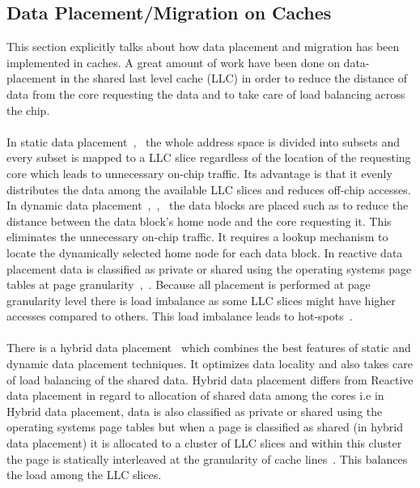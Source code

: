\documentclass{listhesis}
\begin{document}
\subsection{Data Placement/Migration on Caches}
This section explicitly talks about how data placement and migration has been implemented in caches. 
A great amount of work have been done on data-placement in the shared last level cache (LLC) in order to reduce the distance of data from the core requesting the data and to take care of load balancing across the chip.\\
\\
In static data placement~\cite{cacheDataPlacement1},~\cite{cacheDataPlacement2} the whole address space is divided into subsets and every subset is mapped to a LLC slice regardless of the location of the requesting core which leads to unnecessary on-chip traffic. Its advantage is that it evenly distributes the data among the available LLC slices and reduces off-chip accesses. In dynamic data placement~\cite{cacheDataPlacement1},~\cite{cacheDataPlacement3},~\cite{cacheDataPlacement4} the data blocks are placed such as to reduce the distance between the data block's home node and the core requesting it. This eliminates the unnecessary on-chip traffic. It requires a lookup mechanism to locate the dynamically selected home node for each data block. In reactive data placement data is classified as private or shared using the operating systems page tables at page granularity~\cite{cacheDataPlacement4},~\cite{cacheDataPlacement6}. Because all placement is performed at page granularity level there is load imbalance as some LLC slices might have higher accesses compared to others. This load imbalance leads to hot-spots~\cite{cacheDataPlacement6}.\\
\\
There is a hybrid data placement~\cite{cacheDataPlacement6} which combines the best features of static and dynamic data placement techniques. It optimizes data locality and also takes care of load balancing of the shared data. Hybrid data placement differs from Reactive data placement in regard to allocation of shared data among the cores i.e in Hybrid data placement, data is also classified as private or shared using the operating systems page tables but when a page is classified as shared (in hybrid data placement) it is allocated to a cluster of LLC slices and within this cluster the page is statically interleaved at the granularity of cache lines~\cite{cacheDataPlacement6}. This balances the load among the LLC slices.\\
\end{document}
